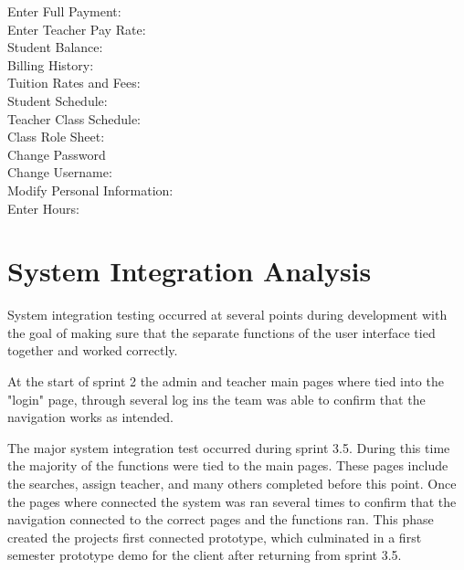 \begin{itemize}

\end{itemize}
Enter Full Payment:\\

Enter Teacher Pay Rate:\\

Student Balance:\\

Billing History:\\

Tuition Rates and Fees:\\

Student Schedule:\\

Teacher Class Schedule:\\

Class Role Sheet:\\

Change Password\\

Change Username:\\

Modify Personal Information:\\

Enter Hours:\\



\section{System Integration Analysis}
System integration testing occurred at several points during development with the goal of making sure that the separate functions of the user interface tied together and worked correctly.

At the start of sprint 2 the admin and teacher main pages where tied into the "login" page, through several log ins the team was able to confirm that the navigation works as intended.

The major system integration test occurred during sprint 3.5. During this time the majority of the functions were tied to the main pages. These pages include the searches, assign teacher, and many others completed before this point. Once the pages where connected the system was ran several times to confirm that the navigation connected to the correct pages and the functions ran. This phase created the projects first connected prototype, which culminated in a first semester prototype demo for the client after returning from sprint 3.5.

